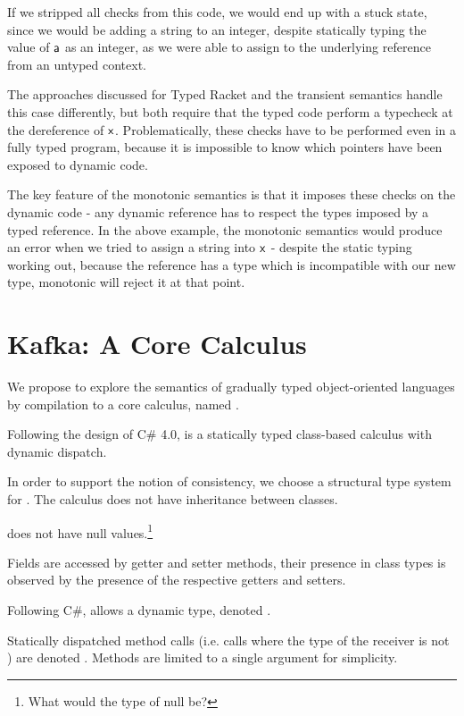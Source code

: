 \documentclass[a4paper,USenglish]{tex/lipics-v2016}
\begin{document}
If we stripped all checks from this code, we would end up with a stuck
state, since we would be adding a string to an integer, despite statically
typing the value of ${\sf{a}}$ as an integer, as we were able to assign to the
underlying reference from an untyped context.

The approaches discussed for Typed Racket and the transient semantics
handle this case differently, but both require that the typed code perform
a typecheck at the dereference of ${\sf{x}}$. Problematically, these checks
have to be performed even in a fully typed program, because it is impossible
to know which pointers have been exposed to dynamic code.

The key feature of the monotonic semantics is that it imposes these checks
on the dynamic code - any dynamic reference has to respect the types imposed
by a typed reference. In the above example, the monotonic semantics would
produce an error when we tried to assign a string into ${\sf{x}}$ - despite the
static typing working out, because the reference has a type which is
incompatible with our new type, monotonic will reject it at that point.

\section{Kafka: A Core Calculus}

We propose to explore the semantics of gradually typed object-oriented
languages by compilation to a core calculus, named \kafka.

Following the design of C\# 4.0, \kafka is a statically typed class-based
calculus with dynamic dispatch.

In order to support the notion of consistency, we choose a structural type
system for \kafka.  The calculus does not have inheritance between classes.

\kafka does not have null values.\footnote{What would the type of null be?}

Fields are accessed by getter and setter methods, their presence in class
types is observed by the presence of the respective getters and setters.


Following C\#, \kafka allows a dynamic type, denoted \any. 

Statically dispatched method calls (i.e. calls where the type of the
receiver is not \any) are denoted \Call\x\m\e. Methods are limited to a
single argument for simplicity.
\end{document}

